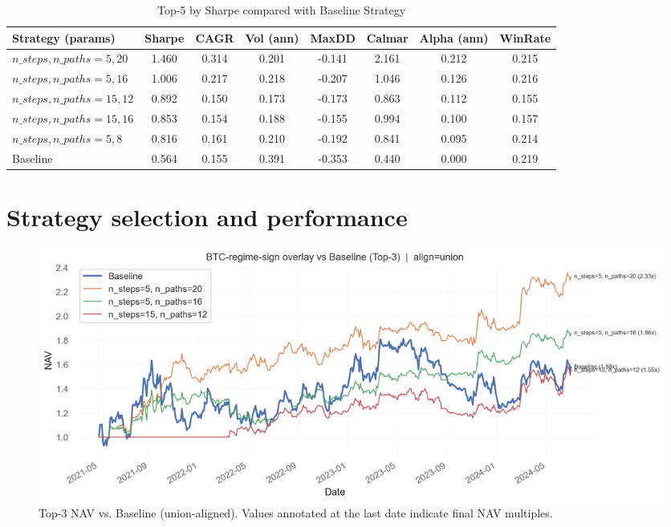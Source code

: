 \begin{table}[t]
\centering
\caption{Top-5 by Sharpe compared with Baseline Strategy}
\small
\label{tab:top5_sharpe_params}
\begin{tabular}{lccccccc}
\toprule
Strategy (params) & Sharpe & CAGR & Vol (ann) & MaxDD & Calmar & Alpha (ann) & WinRate \\
\midrule
$n\_steps, n\_paths=5, 20$ & 1.460 & 0.314 & 0.201 & -0.141 & 2.161 & 0.212 & 0.215 \\
$n\_steps, n\_paths=5, 16$ & 1.006 & 0.217 & 0.218 & -0.207 & 1.046 & 0.126 & 0.216 \\
$n\_steps, n\_paths=15, 12$ & 0.892 & 0.150 & 0.173 & -0.173 & 0.863 & 0.112 & 0.155 \\
$n\_steps, n\_paths=15, 16$ & 0.853 & 0.154 & 0.188 & -0.155 & 0.994 & 0.100 & 0.157 \\
$n\_steps, n\_paths=5, 8$  & 0.816 & 0.161 & 0.210 & -0.192 & 0.841 & 0.095 & 0.214 \\
\hline
Baseline & 0.564 & 0.155 & 0.391 & -0.353 & 0.440 & 0.000 & 0.219 \\

\bottomrule
\end{tabular}
\label{tab:tc_sensitivity}
\end{table}


\section{Strategy selection and performance}\label{sec:results:top5}



\begin{figure}[t]
  \centering
  \includegraphics[width=\linewidth]{headline_plots/top3_nav_union.png}
  \caption{Top-3 NAV vs. Baseline (union-aligned). Values annotated at the last date indicate final NAV multiples.}
  \label{fig:top5_nav_union}
\end{figure}

